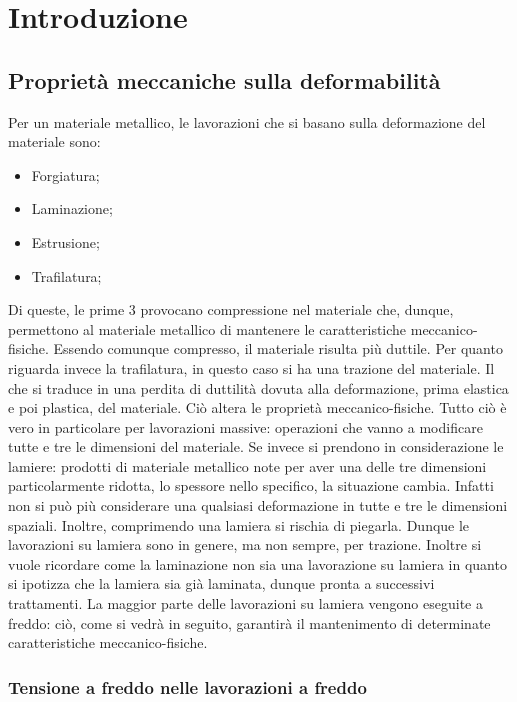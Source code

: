 \chapter{Introduzione}\label{chp:Lamiere}
\section{Proprietà meccaniche sulla deformabilità}
Per un materiale metallico, le lavorazioni che si basano sulla deformazione del materiale sono:
\begin{itemize}
\item Forgiatura;
\item Laminazione;
\item Estrusione;
\item Trafilatura;
\end{itemize}
Di queste, le prime 3 provocano compressione nel materiale che, dunque, permettono al materiale metallico di mantenere le caratteristiche meccanico-fisiche. Essendo comunque compresso, il materiale risulta più duttile.
Per quanto riguarda invece la trafilatura, in questo caso si ha una trazione del materiale. Il che si traduce in una perdita di duttilità dovuta alla deformazione, prima elastica e poi plastica, del materiale. Ciò altera le proprietà meccanico-fisiche.
Tutto ciò è vero in particolare per lavorazioni massive: operazioni che vanno a modificare tutte e tre le dimensioni del materiale.
\newline
Se invece si prendono in considerazione le lamiere: prodotti di materiale metallico note per aver una delle tre dimensioni particolarmente ridotta, lo spessore nello specifico, la situazione cambia. Infatti non si può più considerare una qualsiasi deformazione in tutte e tre le dimensioni spaziali.
Inoltre, comprimendo una lamiera si rischia di piegarla. Dunque le lavorazioni su lamiera sono in genere, ma non sempre, per trazione.
Inoltre si vuole ricordare come la laminazione non sia una lavorazione su lamiera in quanto si ipotizza che la lamiera sia già laminata, dunque pronta a successivi trattamenti.
La maggior parte delle lavorazioni su lamiera vengono eseguite a freddo: ciò, come si vedrà in seguito, garantirà il mantenimento di determinate caratteristiche meccanico-fisiche.

\subsection{Tensione a freddo nelle lavorazioni a freddo}

